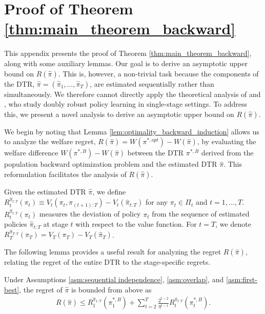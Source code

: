 
\section{Proof of Theorem \ref{thm:main_theorem_backward}}\label{app:main_proof}
\renewcommand{\theequation}{A.\arabic{equation}}
This appendix presents the proof of Theorem \ref{thm:main_theorem_backward}, along with some auxiliary lemmas. Our goal is to derive an asymptotic upper bound on $R(\hat{\pi})$. This is, however, a non-trivial task because the components of the DTR, $\hat{\pi} = (\hat{\pi}_1, \dots, \hat{\pi}_T)$, are estimated sequentially rather than simultaneously. We therefore cannot directly apply the theoretical analysis of \cite{Athey_Wager_2020} and \cite{zhou2022offline}, who study doubly robust policy learning in single-stage settings. To address this, we present a novel analysis to derive an asymptotic upper bound on $R(\hat{\pi})$.

We begin by noting that Lemma \ref{lem:optimality_backward_induction} allows us to analyze the welfare regret, $R(\hat{\pi}) = W(\pi^{\ast,opt}) - W(\hat{\pi})$, by evaluating the welfare difference $W(\pi^{\ast,B}) - W(\hat{\pi})$ between the DTR $\pi^{\ast,B}$ derived from the population backward optimization problem and the estimated DTR $\hat{\pi}$. This reformulation facilitates the analysis of $R(\hat{\pi})$.

Given the estimated DTR $\hat{\pi}$, we define $R_{t}^{\hat{\pi}_{t:T}}(\pi_t) \equiv V_{t}(\pi_t,\hat{\pi}_{(t+1):T}) - V_{t}(\hat{\pi}_{t:T})$ for any $\pi_t \in \Pi_{t}$ and $t=1,\ldots,T$. $R_{t}^{\hat{\pi}_{t:T}}(\pi_t)$ measures the deviation of policy $\pi_{t}$ from the sequence of estimated policies $\hat{\pi}_{t:T}$ at stage $t$ with respect to the value function. For $t=T$, we denote $R_{T}^{\hat{\pi}_{T:T}}(\pi_T)= V_T(\pi_T) - V_T(\hat{\pi}_T)$.

The following lemma provides a useful result for analyzing the regret $R(\hat{\pi})$, relating the regret of the entire DTR to the stage-specific regrets.

\medskip

\begin{lemma}\label{lem:helpful_lemma}
Under Assumptions \ref{asm:sequential independence}, \ref{asm:overlap}, and \ref{asm:first-best}, the regret of $\hat{\pi}$ is bounded from above as
\begin{align}
    R(\hat{\pi}) \leq R_{1}^{\hat{\pi}_{1:T}}(\pi_{1}^{\ast,B}) + \sum_{t=2}^{T} \frac{2^{t-2}}{\eta^{t-1}} R_{t}^{\hat{\pi}_{t:T}}(\pi_{t}^{\ast,B}). \label{eq:decomposition_bound}
\end{align}
\end{lemma}

